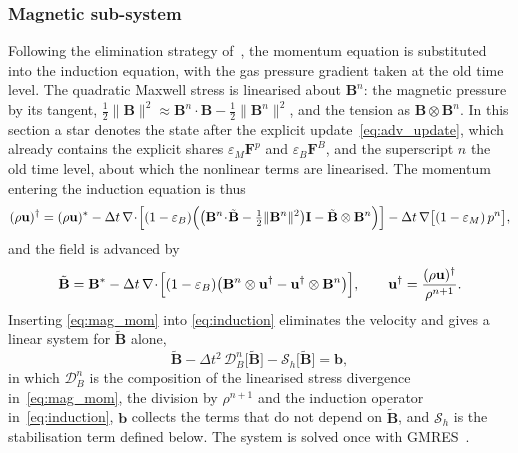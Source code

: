 \documentclass[a4paper,fleqn]{cas-sc}
\theoremstyle{remark}
\newcommand{\eps}{\varepsilon}
\newcommand{\epsM}{\eps_{M}}
\newcommand{\epsB}{\eps_{B}}
\begin{document}
\subsubsection{Magnetic sub-system}
\label{sec:magnetic}
Following the elimination strategy of~\cite{BoscheriThomann2024}, the momentum
equation is substituted into the induction equation, with the gas pressure
gradient taken at the old time level. The quadratic Maxwell stress is linearised about $\mathbf B^{n}$: the magnetic
pressure by its tangent,
$\tfrac12\|\mathbf B\|^{2}\approx\mathbf B^{n}\!\cdot\!\mathbf B-\tfrac12\|\mathbf B^{n}\|^{2}$,
and the tension as $\mathbf B\otimes\mathbf B^{n}$. In this section a star
denotes the state after the explicit update~\eqref{eq:adv_update}, which
already contains the explicit shares $\epsM\mathbf F^p$ and
$\epsB\mathbf F^B$, and the superscript $n$ the old time level, about which
the nonlinear terms are linearised. The momentum entering the induction
equation is thus
\begin{equation}
\label{eq:mag_mom}
(\rho\mathbf u)^{\dagger}=(\rho\mathbf u)^{*}
-\Delta t\,\nabla\!\cdot\!\Bigl[(1-\epsB)\Bigl(
\bigl(\mathbf B^{n}\!\cdot\!\tilde{\mathbf B}-\tfrac12\|\mathbf B^{n}\|^{2}\bigr)\mathbf I
-\tilde{\mathbf B}\otimes\mathbf B^{n}\Bigr)\Bigr]
-\Delta t\,\nabla\bigl[(1-\epsM)\,p^{n}\bigr],
\end{equation}
and the field is advanced by
\begin{equation}
\label{eq:induction}
\tilde{\mathbf B}=\mathbf B^{*}
-\Delta t\,\nabla\!\cdot\!\Bigl[(1-\epsB)\bigl(
\mathbf B^{n}\otimes\mathbf u^{\dagger}-\mathbf u^{\dagger}\otimes\mathbf B^{n}\bigr)\Bigr],
\qquad
\mathbf u^{\dagger}=\frac{(\rho\mathbf u)^{\dagger}}{\rho^{n+1}} .
\end{equation}
Inserting \eqref{eq:mag_mom} into \eqref{eq:induction} eliminates the velocity and
gives a linear system for $\tilde{\mathbf B}$ alone,
\begin{equation}
\label{eq:mag_sys}
\tilde{\mathbf B}-\Delta t^{2}\,\mathcal D_B^{n}\bigl[\tilde{\mathbf B}\bigr]
-\mathcal S_h\bigl[\tilde{\mathbf B}\bigr]=\mathbf b ,
\end{equation}
in which $\mathcal D_B^{n}$ is the composition of the linearised stress divergence in~\eqref{eq:mag_mom}, the division by
$\rho^{n+1}$ and the induction operator in~\eqref{eq:induction},
$\mathbf b$ collects the terms that do not depend on $\tilde{\mathbf B}$, and
$\mathcal S_h$ is the stabilisation term defined below. The system is solved
once with GMRES~\cite{GMRES}.
\end{document}
